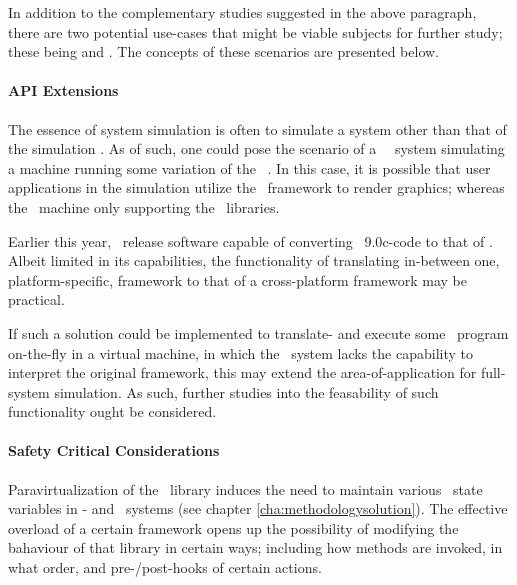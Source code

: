 \noindent
In addition to the complementary studies suggested in the above paragraph, there are two potential use-cases that might be viable subjects for further study; these being  and .
The concepts of these scenarios are presented below.

\paragraph{API Extensions}
\label{par:futurework_apiextensions}
The essence of system simulation is often to simulate a system other than that of the simulation \dvttermhost .
As of such, one could pose the scenario of a \dvttermlinux\ \dvttermhost\ system simulating a machine running some variation of the \dvttermwindows\ \dvttermos .
In this case, it is possible that user applications in the simulation utilize the \dvttermdirectx\ framework to render graphics; whereas the \dvttermhost\ machine only supporting the \dvttermopengl\ libraries.

Earlier this year, \dvttermvalve\ release software capable of converting \dvttermdirectx\ $9.0$c-code to that of \dvttermopengl {}.
Albeit limited in its capabilities, the functionality of translating in-between one, platform-specific, framework to that of a cross-platform framework may be practical.

If such a solution could be implemented to translate- and execute some \dvttermtarget\ program on-the-fly in a virtual machine, in which the \dvttermhost\ system lacks the capability to interpret the original framework, this may extend the area-of-application for full-system simulation.
As such, further studies into the feasability of such functionality ought be considered.

\paragraph{Safety Critical Considerations}
\label{par:futurework_safetycriticalconsiderations}
Paravirtualization of the \dvttermopenglestwopointo\ library induces the need to maintain various \dvttermopengl\ state variables in \dvttermtarget - and \dvttermhost\ systems (see chapter \ref{cha:methodologysolution}).
The effective overload of a certain framework opens up the possibility of modifying the bahaviour of that library in certain ways; including how methods are invoked, in what order, and pre-/post-hooks of certain actions.

